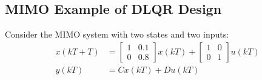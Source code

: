 \documentclass[
  letterpaper,
  DIV=11,
  numbers=noendperiod,
  oneside]{scrartcl}
\begin{document}
\subsection{MIMO Example of DLQR
Design}\label{mimo-example-of-dlqr-design}

Consider the MIMO system with two states and two inputs: \[
\begin{align*} x(kT+T) &= \begin{bmatrix} 1 & 0.1 \\ 0 & 0.8 \end{bmatrix} x(kT) + \begin{bmatrix} 1 & 0 \\ 0 & 1 \end{bmatrix} u(kT) \\ y(kT) &= Cx(kT) + Du(kT) \end{align*}
\]
\end{document}
